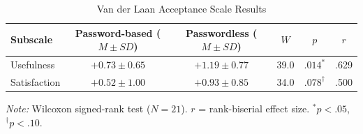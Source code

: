 \documentclass{article}
\begin{document}
\begin{table}[htbp]
    \centering
    \begin{threeparttable}
        \caption{Van der Laan Acceptance Scale Results}
        \label{tab:vdl-results}
        \begin{tabular}{lccccc}
            \toprule
            \textbf{Subscale} & \textbf{Password-based ($M \pm SD$)} & \textbf{Passwordless ($M \pm SD$)} & \textbf{$W$} & \textbf{$p$} & \textbf{$r$} \\
            \midrule
            Usefulness   & $+0.73 \pm 0.65$ & $+1.19 \pm 0.77$ & 39.0 & $.014^{*}$ & .629 \\
            Satisfaction & $+0.52 \pm 1.00$ & $+0.93 \pm 0.85$ & 34.0 & $.078^{\dagger}$ & .500 \\
            \bottomrule
        \end{tabular}
        \begin{tablenotes}
            \small
            \item \textit{Note:} Wilcoxon signed-rank test ($N = 21$). $r$ = rank-biserial effect size. $^{*} p < .05$, $^{\dagger} p < .10$.
        \end{tablenotes}
    \end{threeparttable}
\end{table}
\end{document}
